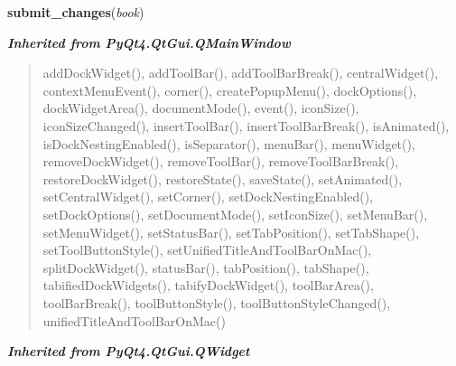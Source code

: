 \hspace{.8\funcindent}\begin{boxedminipage}{\funcwidth}

    \raggedright \textbf{submit\_changes}(\textit{book})

\setlength{\parskip}{2ex}
\setlength{\parskip}{1ex}
    \end{boxedminipage}


\large{\textbf{\textit{Inherited from PyQt4.QtGui.QMainWindow}}}

\begin{quote}
addDockWidget(), addToolBar(), addToolBarBreak(), centralWidget(), contextMenuEvent(), corner(), createPopupMenu(), dockOptions(), dockWidgetArea(), documentMode(), event(), iconSize(), iconSizeChanged(), insertToolBar(), insertToolBarBreak(), isAnimated(), isDockNestingEnabled(), isSeparator(), menuBar(), menuWidget(), removeDockWidget(), removeToolBar(), removeToolBarBreak(), restoreDockWidget(), restoreState(), saveState(), setAnimated(), setCentralWidget(), setCorner(), setDockNestingEnabled(), setDockOptions(), setDocumentMode(), setIconSize(), setMenuBar(), setMenuWidget(), setStatusBar(), setTabPosition(), setTabShape(), setToolButtonStyle(), setUnifiedTitleAndToolBarOnMac(), splitDockWidget(), statusBar(), tabPosition(), tabShape(), tabifiedDockWidgets(), tabifyDockWidget(), toolBarArea(), toolBarBreak(), toolButtonStyle(), toolButtonStyleChanged(), unifiedTitleAndToolBarOnMac()
\end{quote}

\large{\textbf{\textit{Inherited from PyQt4.QtGui.QWidget}}}

